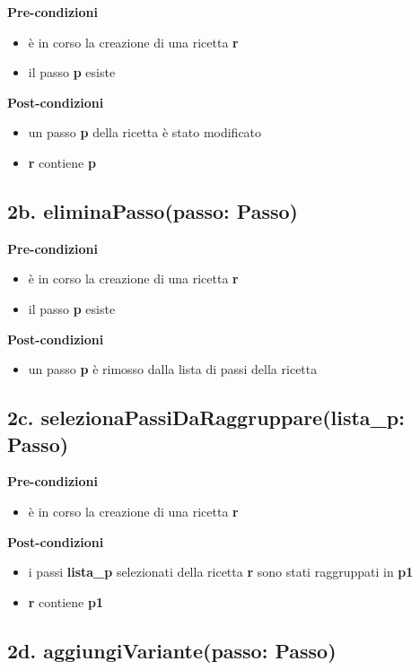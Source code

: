 \documentclass[14pt]{extarticle}
\begin{document}
\textbf{Pre-condizioni}
\begin{itemize}
  \item è in corso la creazione di una ricetta  \textbf{r}
  \item il passo  \textbf{p} esiste
\end{itemize}
\textbf{Post-condizioni}
\begin{itemize}
  \item un passo  \textbf{p} della ricetta è stato modificato
  \item  \textbf{r} contiene  \textbf{p}
\end{itemize}

\subsection*{2b. eliminaPasso(passo: Passo)}

\textbf{Pre-condizioni}
\begin{itemize}
  \item è in corso la creazione di una ricetta  \textbf{r}
  \item il passo  \textbf{p} esiste
\end{itemize}
\textbf{Post-condizioni}
\begin{itemize}
  \item un passo  \textbf{p} è rimosso dalla lista di passi della ricetta
\end{itemize}

\subsection*{2c. selezionaPassiDaRaggruppare(lista\_p: Passo)}

\textbf{Pre-condizioni}
\begin{itemize}
  \item è in corso la creazione di una ricetta  \textbf{r}
\end{itemize}
\textbf{Post-condizioni}
\begin{itemize}
  \item i passi  \textbf{lista\_p} selezionati della ricetta  \textbf{r} sono stati raggruppati in  \textbf{p1}
  \item  \textbf{r} contiene  \textbf{p1}
\end{itemize}

\subsection*{2d. aggiungiVariante(passo: Passo)}
\end{document}
